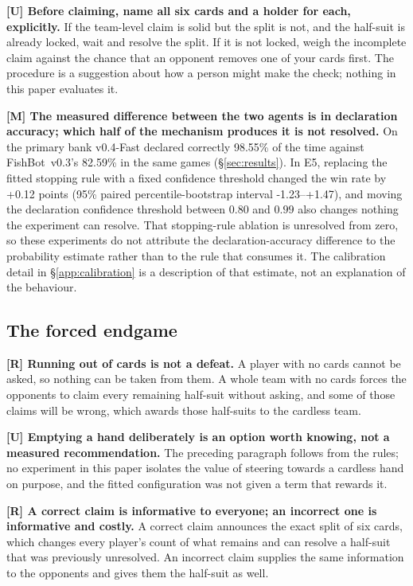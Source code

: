 \documentclass[11pt]{article}
\theoremstyle{definition}
\DeclareRobustCommand{\vfast}{\texorpdfstring{\mbox{v0.4-Fast}}{v0.4-Fast}}
\DeclareRobustCommand{\vthree}{\texorpdfstring{\mbox{FishBot v0.3}}{FishBot v0.3}}
\newcommand{\numVsVthreeDeclAcc}{98.55}
\newcommand{\numVthreeDeclAccSame}{82.59}
\newcommand{\numAblStop}{+0.12}
\newcommand{\numAblStopCI}{-1.23--+1.47}
\begin{document}
\textbf{[U] Before claiming, name all six cards and a holder for each,
explicitly.} If the team-level claim is solid but the split is not, and the
half-suit is already locked, wait and resolve the split. If it is not locked,
weigh the incomplete claim against the chance that an opponent removes one of
your cards first. The procedure is a suggestion about how a person might make the
check; nothing in this paper evaluates it.

\textbf{[M] The measured difference between the two agents is in declaration
accuracy; which half of the mechanism produces it is not resolved.} On the
primary bank \vfast{} declared correctly \numVsVthreeDeclAcc\% of the time
against \vthree{}'s \numVthreeDeclAccSame\% in the same games
(\S\ref{sec:results}). In E5, replacing the fitted stopping rule with a fixed
confidence threshold changed the win rate by \numAblStop{} points (95\% paired
percentile-bootstrap interval \numAblStopCI{}), and moving the declaration
confidence threshold between $0.80$ and $0.99$ also changes nothing the
experiment can resolve. That stopping-rule ablation is
unresolved from zero, so these experiments do not attribute the
declaration-accuracy difference to the probability estimate rather than to the
rule that consumes it. The calibration detail in \S\ref{app:calibration} is a
description of that estimate, not an explanation of the behaviour.

\subsection{The forced endgame}
\label{app:human-endgame}

\textbf{[R] Running out of cards is not a defeat.} A player with no cards cannot
be asked, so nothing can be taken from them. A whole team with no cards forces
the opponents to claim every remaining half-suit without asking, and some of
those claims will be wrong, which awards those half-suits to the cardless team.

\textbf{[U] Emptying a hand deliberately is an option worth knowing, not a
measured recommendation.} The preceding paragraph follows from the rules; no
experiment in this paper isolates the value of steering towards a cardless hand
on purpose, and the fitted configuration was not given a term that rewards it.

\textbf{[R] A correct claim is informative to everyone; an incorrect one is
informative and costly.} A correct claim announces the exact split of six cards,
which changes every player's count of what remains and can resolve a half-suit
that was previously unresolved. An incorrect claim supplies the same information
to the opponents and gives them the half-suit as well.
\end{document}
